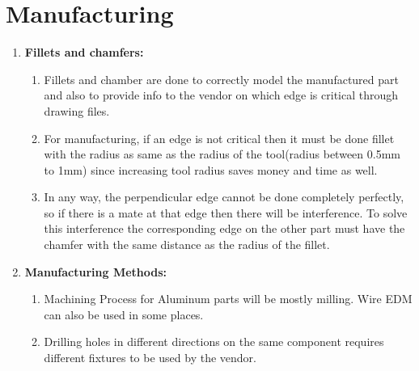 \documentclass[../../main.tex]{subfiles}
\begin{document}
\section{Manufacturing}
\begin{enumerate}
    \item \textbf{Fillets and chamfers:}
    \begin{enumerate}
        \item Fillets and chamber are done to correctly model the manufactured part and also to provide info to the vendor on which edge is critical through drawing files.
        \item For manufacturing, if an edge is not critical then it must be done fillet with the radius as same as the radius of the tool(radius between 0.5mm to 1mm) since increasing tool radius saves money and time as well. 
        \item In any way, the perpendicular edge cannot be done completely perfectly, so if there is a mate at that edge then there will be interference. To solve this interference the corresponding edge on the other part must have the chamfer with the same distance as the radius of the fillet. 
    \end{enumerate}
    \item \textbf{Manufacturing Methods:}
    \begin{enumerate}
        \item Machining Process for Aluminum parts will be mostly milling. Wire EDM can also be used in some places.
        \item Drilling holes in different directions on the same component requires different fixtures to be used by the vendor. 
    \end{enumerate}
\end{enumerate}
\end{document}
